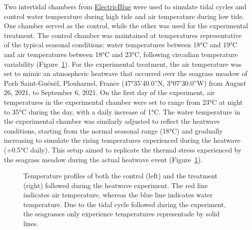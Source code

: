 \documentclass[
  number]{elsarticle}
\begin{document}
Two intertidal chambers from
\href{https://electricblue.eu/intertidal-chamber}{ElectricBlue} were
used to simulate tidal cycles and control water temperature during high
tide and air temperature during low tide. One chamber served as the
control, while the other was used for the experimental treatment. The
control chamber was maintained at temperatures representative of the
typical seasonal conditions: water temperatures between 18°C and 19°C
and air temperatures between 18°C and 23°C, following circadian
temperature variability (Figure~\ref{fig-Profile}). For the experimental
treatment, the air temperature was set to mimic an atmospheric heatwave
that occurred over the seagrass meadow of Porh Saint-Guénël, Plouharnel,
France (47°35'40.0''N, 3°07'30.0''W) from August 26, 2021, to September
6, 2021. On the first day of the experiment, air temperatures in the
experimental chamber were set to range from 23°C at night to 35°C during
the day, with a daily increase of 1°C. The water temperature in the
experimental chamber was similarly adjusted to reflect the heatwave
conditions, starting from the normal seasonal range (18°C) and gradually
increasing to simulate the rising temperatures experienced during the
heatwave (+0.5°C daily). This setup aimed to replicate the thermal
stress experienced by the seagrass meadow during the actual heatwave
event (Figure~\ref{fig-Profile}).

\label{cell-fig-Profile}
\begin{figure}[H]


\caption{\label{fig-Profile}Temperature profiles of both the control
(left) and the treatment (right) followed during the heatwave
experiment. The red line indicates air temperature, whereas the blue
line indicates water temperature. Due to the tidal cycle followed during
the experiment, the seagrasses only experience temperatures representade
by solid lines.}

\end{figure}%
\end{document}
